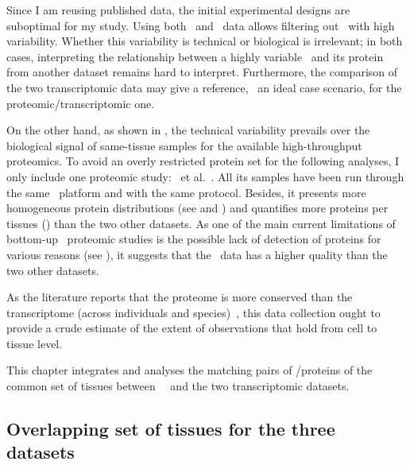 Since I am reusing published data,
the initial experimental designs are suboptimal for my study.
Using both \uhlen\ and \gtex\ data
allows filtering out \mRNAs\ with high variability.
Whether this variability is technical or biological is irrelevant;
in both cases,
interpreting the relationship
between a highly variable \mRNAs\ and its protein from another dataset
remains hard to interpret.
Furthermore, the comparison of the two transcriptomic data may give a reference,
\ie\ an ideal case scenario, for the proteomic/transcriptomic one.

On the other hand,
as shown in ,
the technical variability prevails over
the biological signal of same-tissue samples
for the available high-throughput proteomics.
To avoid an overly restricted protein set for the following analyses,
I only include one proteomic study: \pandey\ et al.~.
All its samples have been run through the same \ms\ platform and
with the same protocol.
Besides, it presents more homogeneous protein distributions
(see  and ) and
quantifies more proteins per tissues ()
than the two other datasets.
As one of the main current limitations of bottom-up \ms\ proteomic studies
is the possible lack of detection of proteins for various reasons
(see ),
it suggests that
the \pandey\ data has a higher quality than the two other datasets.

\vspace{-0.5mm}
As the literature reports that
the proteome is more conserved than the transcriptome
(across individuals and species)~,
this data collection ought to provide
a crude estimate of the extent of observations
that hold from cell to tissue level.

This chapter integrates and analyses the matching pairs of \mRNA/proteins
of the common set of tissues between \pandey\ \etal\
and the two transcriptomic datasets.

\vspace{-2.5mm}
\subsection{Overlapping set of tissues for the three datasets}

